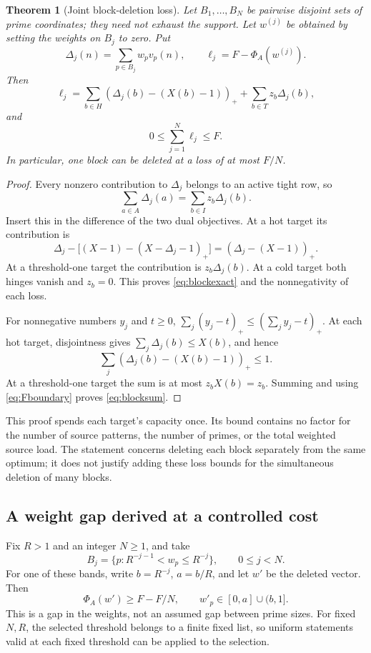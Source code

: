 \documentclass[11pt,a4paper]{article}
\newtheorem{theorem}{Theorem}[section]
\theoremstyle{remark}\newtheorem{remark}[theorem]{Remark}
\newcommand{\pos}[1]{(#1)_+}
\begin{document}
\begin{theorem}[Joint block-deletion loss]
Let \(B_1,\ldots,B_N\) be pairwise disjoint sets of prime coordinates;
they need not exhaust the support. Let \(w^{(j)}\) be obtained by setting
the weights on \(B_j\) to zero. Put
\[
 \Delta_j(n)=\sum_{p\in B_j}w_pv_p(n),\qquad
 \ell_j=F-\Phi_A(w^{(j)}).
\]
Then
\begin{equation}
 \ell_j=\sum_{b\in H}\pos{\Delta_j(b)-(X(b)-1)}
       +\sum_{b\in T}z_b\Delta_j(b),\label{eq:blockexact}
\end{equation}
and
\begin{equation}
 \boxed{\quad 0\le\sum_{j=1}^N\ell_j\le F.\quad}
 \label{eq:blocksum}
\end{equation}
In particular, one block can be deleted at a loss of at most \(F/N\).
\end{theorem}

\begin{proof}
Every nonzero contribution to \(\Delta_j\) belongs to an active tight
row, so
\[
 \sum_{a\in A}\Delta_j(a)=\sum_{b\in I}z_b\Delta_j(b).
\]
Insert this in the difference of the two dual objectives. At a hot
target its contribution is
\[
 \Delta_j-\bigl[(X-1)-(X-\Delta_j-1)_+\bigr]
 =\pos{\Delta_j-(X-1)}.
\]
At a threshold-one target the contribution is \(z_b\Delta_j(b)\).
At a cold target both hinges vanish and \(z_b=0\). This proves
\eqref{eq:blockexact} and the nonnegativity of each loss.

For nonnegative numbers \(y_j\) and \(t\ge0\),
\(\sum_j(y_j-t)_+\le(\sum_jy_j-t)_+\). At each hot target,
disjointness gives \(\sum_j\Delta_j(b)\le X(b)\), and hence
\[
 \sum_j\pos{\Delta_j(b)-(X(b)-1)}\le1.
\]
At a threshold-one target the sum is at most \(z_bX(b)=z_b\).
Summing and using \eqref{eq:Fboundary} proves \eqref{eq:blocksum}.
\end{proof}

This proof spends each target's capacity once. Its bound contains no
factor for the number of source patterns, the number of primes, or
the total weighted source load. The statement concerns deleting each
block separately from the same optimum; it does not justify adding
these loss bounds for the simultaneous deletion of many blocks.

\subsection{A weight gap derived at a controlled cost}

Fix \(R>1\) and an integer \(N\ge1\), and take
\[
 B_j=\{p:R^{-j-1}<w_p\le R^{-j}\},\qquad 0\le j<N.
\]
For one of these bands, write \(b=R^{-j}\), \(a=b/R\), and let \(w'\)
be the deleted vector. Then
\begin{equation}
 \Phi_A(w')\ge F-F/N,\qquad
 w'_p\in[0,a]\cup(b,1].\label{eq:weightgap}
\end{equation}
This is a gap in the weights, not an assumed gap between prime sizes.
For fixed \(N,R\), the selected threshold belongs to a finite fixed
list, so uniform statements valid at each fixed threshold can be
applied to the selection.
\end{document}
